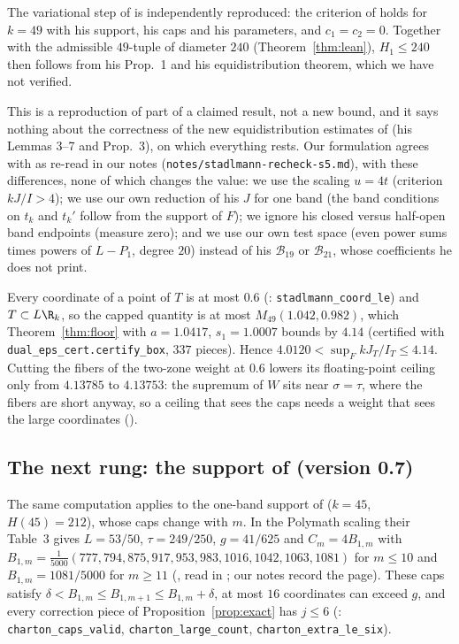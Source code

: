 \begin{corollary}\label{cor:240}
The variational step of \cite{Sta26} is independently reproduced: the
criterion of \cite[Prop.~1]{Sta26} holds for $k=49$ with his support, his
caps and his parameters, and $c_1=c_2=0$. Together with the
 admissible $49$-tuple of diameter $240$
(Theorem~\ref{thm:lean}), $H_1\le240$ then follows from his Prop.~1 and his
equidistribution theorem, which we have not verified.
\end{corollary}

This is a reproduction of part of a claimed result, not a new bound, and it
says nothing about the correctness of the new equidistribution estimates of
\cite{Sta26} (his Lemmas 3--7 and Prop.~3), on which everything rests. Our
formulation agrees with \cite{Sta26} as re-read in our notes
(\texttt{notes/stadlmann-\allowbreak recheck-s5.md}), with these differences, none of which
changes the value: we use the scaling $u=4t$ (criterion $kJ/I>4$); we use our
own reduction of his $J$ for one band (the band conditions on $t_k$ and
$t_k'$ follow from the support of $F$); we ignore his closed versus half-open
band endpoints (measure zero); and we use our own test space (even power sums
times powers of $L-P_1$, degree $20$) instead of his $\mathcal B_{19}$ or
$\mathcal B_{21}$, whose coefficients he does not print.

\begin{remark}\label{rem:ceiling}
Every coordinate of a point of $T$ is at most $0.6$
(: \texttt{stadlmann\_coord\_le}) and $T\subset L\R_k$, so
the capped quantity is at most $M_{49}(1.042,0.982)$, which
Theorem~\ref{thm:floor} with $a=1.0417$, $s_1=1.0007$ bounds by $4.14$
(certified with \texttt{dual\_eps\_cert.certify\_box}, $337$ pieces). Hence
$4.0120<\sup_F kJ_T/I_T\le4.14$. Cutting the fibers of the two-zone weight at
$0.6$ lowers its floating-point ceiling only from $4.13785$ to $4.13753$: the
supremum of $W$ sits near $\sigma=\tau$, where the fibers are short anyway,
so a ceiling that sees the caps needs a weight that sees the large
coordinates ().
\end{remark}

\subsection*{The next rung: the support of \texorpdfstring{\cite{Cha26}}{Charton et al.} (version 0.7)}
The same computation applies to the one-band support of \cite{Cha26}
($k=45$, $H(45)=212$), whose caps change with $m$. In the Polymath scaling
their Table~3 gives $L=53/50$, $\tau=249/250$, $g=41/625$ and
$C_m=4B_{1,m}$ with
$B_{1,m}=\frac{1}{5000}(777,794,875,917,953,983,1016,1042,1063,1081)$ for
$m\le10$ and $B_{1,m}=1081/5000$ for $m\ge11$ (, read in
\cite{Cha26}; our notes record the page). These caps satisfy
$\delta<B_{1,m}\le B_{1,m+1}\le B_{1,m}+\delta$, at most $16$ coordinates can
exceed $g$, and every correction piece of Proposition~\ref{prop:exact} has
$j\le6$ (: \texttt{charton\_caps\_valid},
\texttt{charton\_large\_count}, \texttt{charton\_extra\_le\_six}).

